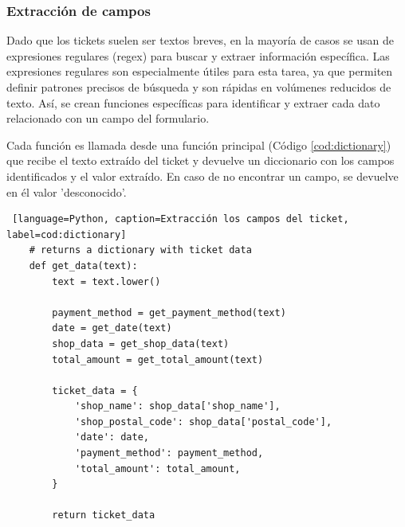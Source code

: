 \subsubsection{Extracción de campos}
Dado que los tickets suelen ser textos breves, en la mayoría de casos se usan de expresiones regulares (regex) para buscar y extraer información específica. Las expresiones regulares son especialmente útiles para esta tarea, ya que permiten definir patrones precisos de búsqueda y son rápidas en volúmenes reducidos de texto. Así, se crean funciones específicas para identificar y extraer cada dato relacionado con un campo del formulario.

Cada función es llamada desde una función principal (Código \ref{cod:dictionary}) que recibe el texto extraído del ticket y devuelve un diccionario con los campos identificados y el valor extraído. En caso de no encontrar un campo, se devuelve en él valor 'desconocido'.

\begin{lstlisting} [language=Python, caption=Extracción los campos del ticket, label=cod:dictionary]
    # returns a dictionary with ticket data
    def get_data(text):
        text = text.lower()

        payment_method = get_payment_method(text)
        date = get_date(text)
        shop_data = get_shop_data(text)
        total_amount = get_total_amount(text)

        ticket_data = {
            'shop_name': shop_data['shop_name'],
            'shop_postal_code': shop_data['postal_code'],
            'date': date,
            'payment_method': payment_method,
            'total_amount': total_amount,
        }

        return ticket_data
\end{lstlisting}


